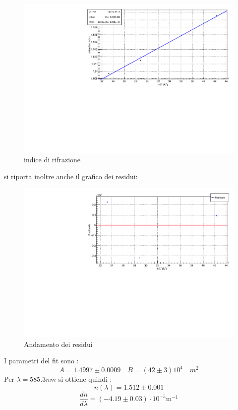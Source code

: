 \documentclass{article}
\begin{document}
\begin{center}
	\begin{figure}[ht]
		\centering
		\includegraphics[scale=0.38, angle=0]{nFit.pdf}
		\caption{ indice di rifrazione}
		\label{fig:nFit}
	\end{figure}
\end{center}

si riporta inoltre anche il grafico dei residui:
\begin{center}
	\begin{figure}[ht]
		\centering
		\includegraphics[scale=0.38, angle=0]{nFitRes.pdf}
		\caption{ Andamento dei residui}
		\label{fig:nFitRes}
	\end{figure}
\end{center}

	I parametri del fit sono :
	$$ A= 1.4997 \pm 0.0009 \quad B= (42 \pm 3 )10^4 \quad m^2$$
	Per $\lambda= 585.3 nm$ si ottiene quindi :
	$$n(\lambda)= 1.512 \pm 0.001  $$
	$$  \frac{dn}{d\lambda} = (-4.19 \pm 0.03 )\cdot 10^{-5} \text{m}^{-1}$$
\end{document}
